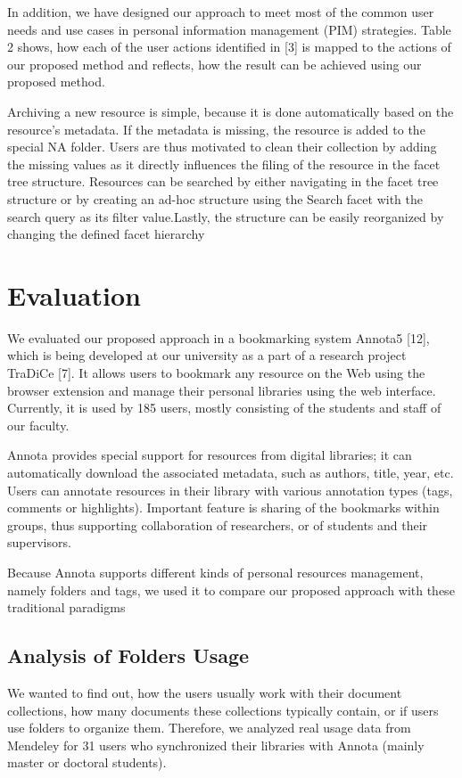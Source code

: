 \documentclass{article}
\begin{document}
   
In addition, we have designed our approach to meet most of the common user needs and use cases in personal information management (PIM) strategies. Table 2 shows, how each of the user actions identified in [3] is mapped to the actions of our proposed method and reflects, how the result can be achieved using our proposed method.
   
    Archiving a new resource is simple, because it is done automatically based on the resource’s metadata. If the metadata is missing, the resource is added to the special NA folder. Users are thus motivated to clean their collection by adding the missing values as it directly influences the filing of the resource in the facet tree structure. Resources can be searched by either navigating in the facet tree structure or by creating an ad-hoc structure using the Search facet with the search query as its filter value.Lastly, the structure can be easily reorganized by changing the defined facet hierarchy
  
\section{Evaluation}
We evaluated our proposed approach in a bookmarking system Annota5 [12], which is being developed at our university as a part of a research project TraDiCe [7]. It allows users to bookmark any resource on the Web using the browser extension and manage their personal libraries using the web interface. Currently, it is used by 185 users, mostly consisting of the students and staff of our faculty.

 Annota provides special support for resources from digital libraries; it can automatically download the associated metadata, such as authors, title, year, etc. Users can annotate resources in their library with various annotation types (tags, comments or highlights). Important feature is sharing of the bookmarks within groups, thus supporting collaboration of researchers, or of students and their supervisors.
 
  Because Annota supports different kinds of personal resources management, namely folders and tags, we used it to compare our proposed approach with these traditional paradigms
  
 \subsection{Analysis of Folders Usage }
 We wanted to find out, how the users usually work with their document collections, how many documents these collections typically contain, or if users use folders to organize them. Therefore, we analyzed real usage data from Mendeley for 31 users who synchronized their libraries with Annota (mainly master or doctoral students).
 
\end{document}
